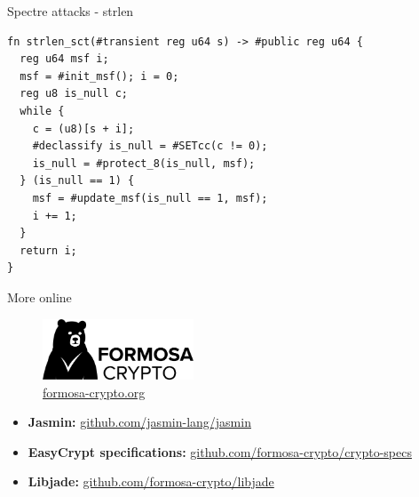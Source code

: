 \begin{frame}[fragile]{Spectre attacks - strlen}
  \lstset{
    language=Jasmin,
    basicstyle=\footnotesize\ttfamily,
  }
  \begin{lstlisting}
fn strlen_sct(#transient reg u64 s) -> #public reg u64 {
  reg u64 msf i;
  msf = #init_msf(); i = 0;
  reg u8 is_null c;
  while {
    c = (u8)[s + i];
    #declassify is_null = #SETcc(c != 0);
    is_null = #protect_8(is_null, msf);
  } (is_null == 1) {
    msf = #update_msf(is_null == 1, msf);
    i += 1;
  }
  return i;
}
  \end{lstlisting}
\end{frame}

\begin{frame}{More online}
  \begin{center}
    \begin{figure}[t]
      \centering
      \includegraphics[width=0.4\textwidth]{formosa}
      \caption*{\Large \url{formosa-crypto.org}}
    \end{figure}
  \end{center}
  \vspace*{.5cm}
  \begin{itemize}
  \item[] \textbf{Jasmin:} \url{github.com/jasmin-lang/jasmin}
  \item[] \textbf{EasyCrypt specifications:}
    \url{github.com/formosa-crypto/crypto-specs}
  \item[] \textbf{Libjade:} \url{github.com/formosa-crypto/libjade}
  \end{itemize}
\end{frame}
